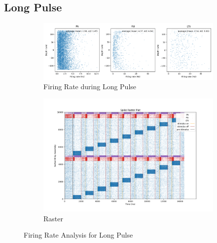 \documentclass[12pt, letterpaper]{article}
\begin{document}
\subsection*{Long Pulse}

\begin{figure}[H]
  \centering
  \begin{subfigure}{\textwidth}
    \centering
    \includegraphics[width=\textwidth]{output/long-spikes}
    \caption{Firing Rate during Long Pulse}
    \label{fig:long-spikes}
  \end{subfigure}
  \begin{subfigure}{\textwidth}
    \centering
    \includegraphics[width=\textwidth]{output/long-raster}
    \caption{Raster}
    \label{fig:long-raster}
  \end{subfigure}
  \caption{Firing Rate Analysis for Long Pulse}
\end{figure}
\end{document}
